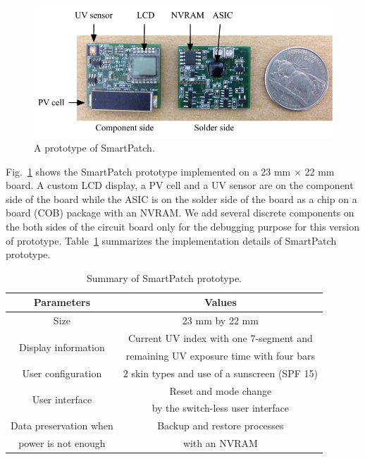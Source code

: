 \documentclass[journal]{IEEEtran}
\begin{document}
\begin{figure}
\centering
\includegraphics[width=1.0\hsize]{Figures/prototype.pdf}
\caption{A prototype of SmartPatch.}
\label{fig:prototype}
\end{figure}

Fig.~\ref{fig:prototype} shows the SmartPatch prototype implemented on a 23 mm $\times$ 22 mm board.
A custom LCD display, a PV cell and a UV sensor are on the component side of the board while the ASIC is on the solder side of the board as a chip on a board (COB) package with an NVRAM.
We add several discrete components on the both sides of the circuit board only for the debugging purpose for this version of prototype.
Table~\ref{table:prototype_summary} summarizes the implementation details of SmartPatch prototype.

\begin{table}
\centering
\caption{Summary of SmartPatch prototype.}
\label{table:prototype_summary}
\begin{tabular}{|c|c|}  \hline
Parameters			&Values	\\ \hline \hline
Size					&23 mm by 22 mm  \\ \hline
\multirow{2}{*}{Display information}	&Current UV index with one 7-segment and\\
					&remaining UV exposure time with four bars \\ \hline
User configuration		&2 skin types and use of a sunscreen (SPF 15) \\ \hline
\multirow{2}{*}{User interface}	&Reset and mode change  \\
					&by the switch-less user interface \\ \hline
Data preservation when 	&Backup and restore processes  \\
power is not enough	&with an NVRAM \\ \hline
\end{tabular}
\end{table}
\end{document}
